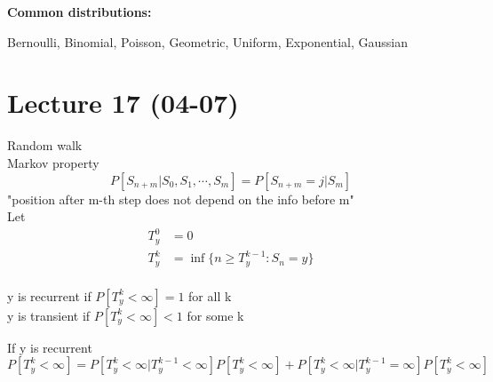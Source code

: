 \noindent\textbf{Common distributions:}

\noindent Bernoulli, Binomial, Poisson, Geometric, Uniform, Exponential, Gaussian 
\section{Lecture 17 (04-07)}
Random walk
\\Markov property
$$
    P[S_{n+m}|S_0,S_1,\cdots,S_m]=P[S_{n+m}=j|S_m]
$$ 
"position after m-th step does not depend on the info before m"
\\Let \begin{align*}{}{}
T_y^0&=0\\
T_y^k&=\inf\{n\geq T_y^{k-1}:S_n=y\}\\
\end{align*}
\begin{definition}[]{}
y is recurrent if $P[T_y^k<\infty]=1$ for all k
\\y is transient if $P[T_y^k<\infty]<1$ for some k
\end{definition}
\begin{remark}[]{}
If y is recurrent
$$
    P[T_y^k<\infty]=P[T_y^k<\infty|T_y^{k-1}<\infty] P[T_y^k<\infty]+P[T_y^k<\infty|T_y^{k-1}=\infty] P[T_y^k<\infty]
$$ 
\end{remark}
